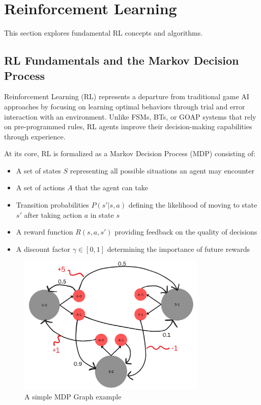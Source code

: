 \section{Reinforcement Learning}

This section explores fundamental RL concepts and algorithms.

\subsection{RL Fundamentals and the Markov Decision Process}

Reinforcement Learning (RL) represents a departure from traditional game AI approaches by focusing on learning optimal behaviors through trial and error interaction with an environment. 
Unlike FSMs, BTs, or GOAP systems that rely on pre-programmed rules, RL agents improve their decision-making capabilities through experience.

At its core, RL is formalized as a Markov Decision Process (MDP) consisting of:
\begin{itemize}
    \item A set of states $S$ representing all possible situations an agent may encounter
    \item A set of actions $A$ that the agent can take
    \item Transition probabilities $P(s'|s,a)$ defining the likelihood of moving to state $s'$ after taking action $a$ in state $s$
    \item A reward function $R(s,a,s')$ providing feedback on the quality of decisions
    \item A discount factor $\gamma \in [0,1]$ determining the importance of future rewards
\end{itemize}

\begin{figure}[H]
    \centering
    \includegraphics[width=0.8\textwidth]{figures/mdp_framework.png}
    \caption{A simple MDP Graph example}
    \label{fig:mdp-framework}
\end{figure}

